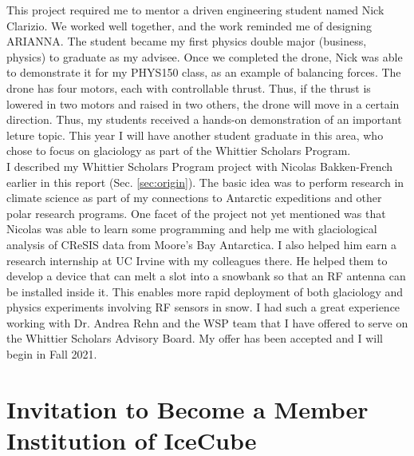 \documentclass[../../../main.tex]{subfiles}
\begin{document}
This project required me to mentor a driven engineering student named Nick Clarizio.  We worked well together, and the work reminded me of designing ARIANNA.  The student became my first physics double major (business, physics) to graduate as my advisee.  Once we completed the drone, Nick was able to demonstrate it for my PHYS150 class, as an example of balancing forces.  The drone has four motors, each with controllable thrust.  Thus, if the thrust is lowered in two motors and raised in two others, the drone will move in a certain direction.  Thus, my students received a hands-on demonstration of an important leture topic.  This year I will have another student graduate in this area, who chose to focus on glaciology as part of the Whittier Scholars Program.
\\
\vspace{0.25cm}
I described my Whittier Scholars Program project with Nicolas Bakken-French earlier in this report (Sec. \ref{sec:origin}).  The basic idea was to perform research in climate science as part of my connections to Antarctic expeditions and other polar research programs.  One facet of the project not yet mentioned was that Nicolas was able to learn some programming and help me with glaciological analysis of CReSIS data from Moore's Bay Antarctica.  I also helped him earn a research internship at UC Irvine with my colleagues there.  He helped them to develop a device that can melt a slot into a snowbank so that an RF antenna can be installed inside it.  This enables more rapid deployment of both glaciology and physics experiments involving RF sensors in snow.  I had such a great experience working with Dr. Andrea Rehn and the WSP team that I have offered to serve on the Whittier Scholars Advisory Board.  My offer has been accepted and I will begin in Fall 2021.

\section{Invitation to Become a Member Institution of IceCube}
\end{document}
